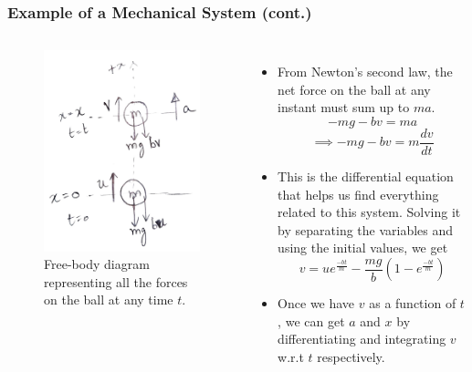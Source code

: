 \documentclass[10pt]{beamer}
\begin{document}
\begin{frame}
    \fontsize{9pt}{10pt}\selectfont
    \frametitle{Example of a Mechanical System (cont.)}
	\begin{columns}
        \begin{figure}
            \centering
            \includegraphics[height=0.6\textheight,width=\textwidth]{images/mechanics1.jpeg}
            \vfill
            \caption{Free-body diagram representing all the forces on the ball at any time $t$.}
            \label{fig:mechanics1}
        \end{figure}

        \begin{itemize}
            \item From Newton's second law, the net force on the ball at any instant must sum up to $ma$.
                $$
                -mg -bv = ma
                $$
                $$
                \implies-mg -bv = m \frac{dv}{dt}
                $$
            \item This is the differential equation that helps us find everything related to this system. Solving it by separating the variables and using the initial values, we get
                $$
                v = ue^{\frac{-bt}{m}} - \frac{mg}{b} (1 - e^{\frac{-bt}{m}})
                $$
            \item Once we have $v$ as a function of $t$, we can get $a$ and $x$ by differentiating and integrating $v$ w.r.t $t$ respectively.
        \end{itemize}

	\end{columns}
\end{frame}
\end{document}
